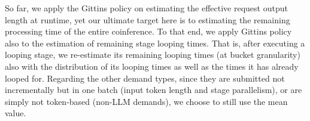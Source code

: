 

So far, we apply the Gittins policy on estimating the effective request output length at runtime, yet our ultimate target here is to estimating the remaining processing time of the entire coinference. 
To that end, we apply Gittins policy also to the estimation of remaining stage looping times.
That is, after executing a looping stage, we re-estimate
its remaining looping times (at bucket granularity) also with the distribution of its looping times as well as the times it has already looped for.
Regarding the other demand types, since they are submitted not incrementally but in one batch (input token length and stage parallelism), or are simply not token-based (non-LLM demands), we choose to still use the mean value.

